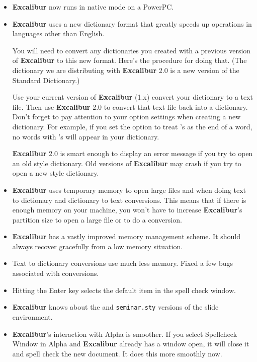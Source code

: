 ﻿\documentclass[11pt,titlepage]{article}
\newcommand{\ex}{\textbf{Excalibur}}
\newcommand{\SLiTeX}{\latex{\textsc{Sli\TeX}}\html{SliTeX}}
\begin{document}
\begin{itemize}

\item \ex{} now runs in native mode on a PowerPC.

\item \ex{} uses a new dictionary format that greatly speeds up
  operations in languages other than English.

  You will need to convert any dictionaries you created with a
  previous version of \ex{} to this new format.  Here's the procedure
  for doing that.  (The dictionary we are distributing with \ex{} 2.0
  is a new version of the Standard Dictionary.)

  Use your current version of \ex{} (1.x) convert your dictionary to a
  text file.  Then use \ex{} 2.0 to convert that text file back into a
  dictionary.  Don't forget to pay attention to your option settings
  when creating a new dictionary.  For example, if you set the option
  to treat 's as the end of a word, no words with 's will appear in
  your dictionary.

  \ex{} 2.0 is smart enough to display an error message if you try to
  open an old style dictionary.  Old versions of \ex{} may crash if
  you try to open a new style dictionary.

\item \ex{} uses temporary memory to open large files and when doing
  text to dictionary and dictionary to text conversions.  This means
  that if there is enough memory on your machine, you won't have to
  increase \ex's partition size to open a large file or to do a
  conversion.

\item \ex{} has a vastly improved memory management scheme.  It should
  always recover gracefully from a low memory situation.

\item Text to dictionary conversions use much less memory.  Fixed a
  few bugs associated with conversions.

\item Hitting the Enter key selects the default item in the spell
  check window.

\item \ex{} knows about the \SLiTeX{} and \texttt{seminar.sty}
  versions of the slide environment.

\item \ex's interaction with Alpha is smoother.  If you select
  Spellcheck Window in Alpha and \ex{} already has a window open, it
  will close it and spell check the new document.  It does this more
  smoothly now.


\end{itemize}
\end{document}
